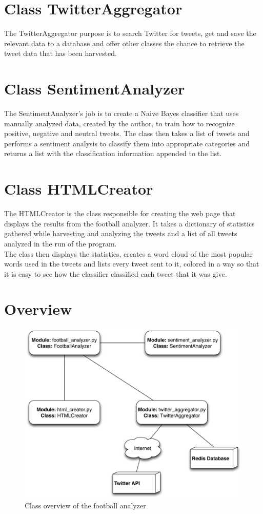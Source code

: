 \section{Class TwitterAggregator} \label{sec:TwitterAggregatorDesign}
The TwitterAggregator purpose is to search Twitter for tweets, get and save the relevant data to a database
and offer other classes the chance to retrieve the tweet data that has been harvested.

\section{Class SentimentAnalyzer} \label{sec:SentimentAnalyzerDesign}
The SentimentAnalyzer's job is to create a Naive Bayes classifier that uses manually analyzed data, created
by the author, to train how to recognize positive, negative and neutral tweets. The class then takes a list
of tweets and performs a sentiment analysis to classify them into appropriate categories and returns a list
with the classification information appended to the list.

\section{Class HTMLCreator} \label{sec:HTMLCreatorDesign}
The HTMLCreator is the class responsible for creating the web page that displays the results from the football
analyzer. It takes a dictionary of statistics gathered while harvesting and analyzing the tweets and a list of 
all tweets analyzed in the run of the program. \\

The class then displays the statistics, creates a word cloud of the most popular words used in the tweets and
lists every tweet sent to it, colored in a way so that it is easy to see how the classifier classified each
tweet that it was give.

\section{Overview} \label{sec:ClassOverview}
\begin{figure}[ht]
	\centering
		\includegraphics[height=330px]{images/ClassOverview.png}
	\caption{ Class overview of the football analyzer }
	\label{fig:images_ClassOverview}
\end{figure}